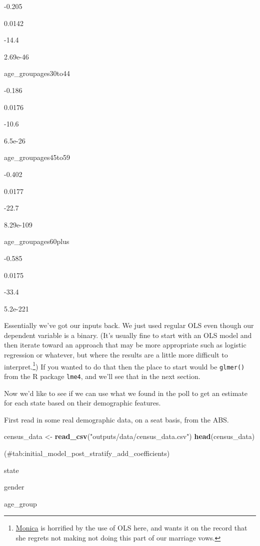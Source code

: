 \documentclass[
]{book}
\newenvironment{Shaded}{\begin{snugshade}}{\end{snugshade}}
\newcommand{\KeywordTok}[1]{\textcolor[rgb]{0.13,0.29,0.53}{\textbf{#1}}}
\newcommand{\NormalTok}[1]{#1}
\newcommand{\StringTok}[1]{\textcolor[rgb]{0.31,0.60,0.02}{#1}}
\begin{document}
-0.205

0.0142

-14.4

2.69e-46~

age\_groupages30to44

-0.186

0.0176

-10.6

6.5e-26~~

age\_groupages45to59

-0.402

0.0177

-22.7

8.29e-109

age\_groupages60plus

-0.585

0.0175

-33.4

5.2e-221~

Essentially we've got our inputs back. We just used regular OLS even though our dependent variable is a binary. (It's usually fine to start with an OLS model and then iterate toward an approach that may be more appropriate such as logistic regression or whatever, but where the results are a little more difficult to interpret.\footnote{\href{https://www.monicaalexander.com/}{Monica} is horrified by the use of OLS here, and wants it on the record that she regrets not making not doing this part of our marriage vows.}) If you wanted to do that then the place to start would be \texttt{glmer()} from the R package \texttt{lme4}, and we'll see that in the next section.

Now we'd like to see if we can use what we found in the poll to get an estimate for each state based on their demographic features.

First read in some real demographic data, on a seat basis, from the ABS.

\begin{Shaded}
\begin{Highlighting}[]
\NormalTok{census_data <-}\StringTok{ }\KeywordTok{read_csv}\NormalTok{(}\StringTok{"outputs/data/census_data.csv"}\NormalTok{)}
\KeywordTok{head}\NormalTok{(census_data)}
\end{Highlighting}
\end{Shaded}

(\#tab:initial\_model\_post\_stratify\_add\_coefficients)

state

gender

age\_group
\end{document}
